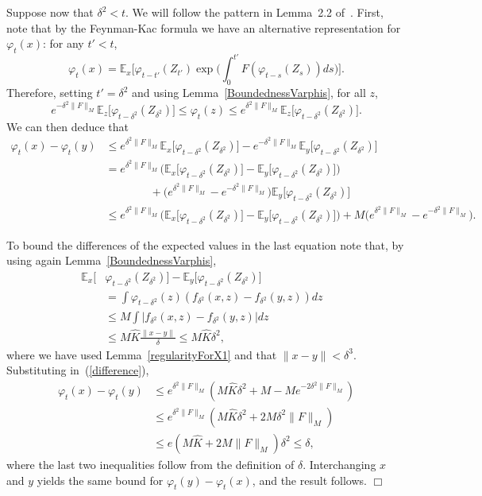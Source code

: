 \documentclass[12pt]{article}
\newenvironment {proof}{{\noindent\bf Proof }}{\hfill $\Box$ \medskip}
\newcommand{\IE}{\mathbb E}
\numberwithin{equation}{section}
\begin{document}
\begin{proof}
Suppose now that $\delta^2<t$.
We will follow the pattern in Lemma~2.2 of~\cite{penington:2017}. 
First, note that by the Feynman-Kac formula we have an alternative 
representation for $\varphi_t(x)$: for any $t'<t$,
\[ 
\varphi_t(x) = \IE_x\Big[ \varphi_{t-t'}(Z_{t'}) 
\exp\big( \int_0^{t'} F(\varphi_{t-s}(Z_s)) ds \big) \Big]. 
\]
Therefore, setting $t'=\delta^2$ and using Lemma~\ref{BoundednessVarphis}, for all $z$,
\[ 
e^{-\delta^2\| F \|_{M}}\IE_z\big[ \varphi_{t-\delta^2}(Z_{\delta^2})\big] 
\leq  
\varphi_t(z) 
\leq e^{\delta^2\| F \|_{M}} \IE_z\big[  \varphi_{t-\delta^2}(Z_{\delta^2})\big]. 
\]
We can then deduce that
\begin{align}
\nonumber
\varphi_t(x)-\varphi_t(y) 
&\leq e^{\delta^2\| F \|_{M}}\IE_x\big[ \varphi_{t-\delta^2}(Z_{\delta^2})\big] 
- e^{-\delta^2\| F \|_{M}}\IE_y\big[ \varphi_{t-\delta^2}(Z_{\delta^2})\big] 
\\ 
\nonumber
& = e^{\delta^2\| F \|_{M}}
\Big(\IE_x\big[ \varphi_{t-\delta^2}(Z_{\delta^2})\big]
- \IE_y\big[ \varphi_{t-\delta^2}(Z_{\delta^2})\big]\Big) 
\\ 
\nonumber
&\qquad \qquad 
+ \big(e^{\delta^2\| F \|_{M}} - e^{-\delta^2\| F \|_{M}}  \big)
\IE_y\big[ \varphi_{t-\delta^2}(Z_{\delta^2})\big] 
\\
\label{difference}
&\leq e^{\delta^2\| F \|_{M}} 
\Big(\IE_x\big[ \varphi_{t-\delta^2}(Z_{\delta^2})\big]- 
\IE_y\big[ \varphi_{t-\delta^2}(Z_{\delta^2})\big]) 
+ M\big(e^{\delta^2\| F \|_{M}}-e^{-\delta^2\| F \|_{M}}\big) .
\end{align}

To bound the differences of the expected values in the last equation 
note that, by using again Lemma~\ref{BoundednessVarphis},
\begin{align*}
\IE_x\big[ &\varphi_{t-\delta^2}(Z_{\delta^2})\big]
- \IE_y[ \varphi_{t-\delta^2}(Z_{\delta^2})\big] & \\ 
& = \int \varphi_{t-\delta^2}(z) (f_{\delta^2}(x,z)-f_{\delta^2}(y,z) ) dz  \\ 
&\leq M \int \big|f_{\delta^2}(x,z)-f_{\delta^2}(y,z) \big| dz \\ 
&\leq M \widehat{K} \frac{\|x-y\|}{\delta}  
\leq M \widehat{K} \delta^2, 
\end{align*}
where we have used Lemma~\ref{regularityForX1} and that $\|x-y\| < \delta^3$.
Substituting in~(\ref{difference}),
\begin{align*}
\varphi_t(x)-\varphi_t(y)
&\leq e^{\delta^2 \| F \|_{M}} 
\left(M \widehat{K}\delta^2 +M - M e^{-2\delta^2\| F \|_{M}}  \right) \\ 
& \leq e^{\delta^2 \| F \|_{M}}\left(M \widehat{K}\delta^2 
+ 2 M \delta^2\| F \|_{M}  \right) \\ 
&\leq e \left( M \widehat{K}+2 M \| F \|_M  \right) \delta^2 \leq  \delta,
\end{align*}
where the last two inequalities follow from the definition of $\delta$. 
Interchanging $x$ and $y$ yields the same bound for $\varphi_t(y)-\varphi_t(x)$, and the result 
follows.
\end{proof}
\end{document}
